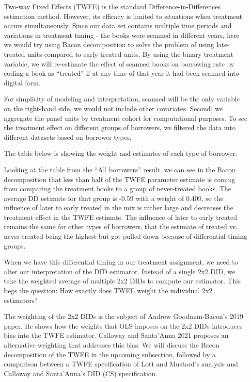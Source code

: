 \documentclass{article}
\begin{document}
Two-way Fixed Effects (TWFE) is the standard Difference-in-Differences estimation method. However, its efficacy is limited to situations when treatment occurs simultaneously. Since our data set contains multiple time periods and variations in treatment timing - the books were scanned in different years, here we would try using Bacon decomposition to solve the problem of using late-treated units compared to early-treated units. By using the binary treatment variable, we will re-estimate the effect of scanned books on borrowing rate by coding a book as “treated” if at any time of that year it had been scanned into digital form.

For simplicity of modeling and interpretation, scanned will be the only variable on the right-hand side, we would not include other covariates. Second, we aggregate the panel units by treatment cohort for computational purposes. To see the treatment effect on different groups of borrowers, we filtered the data into different datasets based on borrower types.

The table below is showing the weight and estimates of each type of borrower:



Looking at the table from the “All borrowers” result, we can see in the Bacon decomposition that less than half of the TWFE parameter estimate is coming from comparing the treatment books to a group of never-treated books. The average DD estimate for that group is -0.59  with a weight of 0.409, so the influence of later to early treated in the mix is rather large and decreases the treatment effect in the TWFE estimate. The influence of later to early treated remains the same for other types of borrowers, that the estimate of treated vs. never-treated being the highest but got pulled down because of differential timing groups.

When we have this differential timing in our treatment assignment, we need to alter our interpretation of the DID estimator. Instead of a single 2x2 DID, we take the weighted average of multiple 2x2 DIDs to compute our estimator. This begs the question: How exactly does TWFE weight the individual 2x2 estimators? 

The weighting of the 2x2 DIDs is the subject of Andrew Goodman-Bacon's 2019 paper. He shows how the weights that OLS imposes on the 2x2 DIDs introduces bias into the TWFE estimator. Calloway and Santa'Anna 2021 proposes an alternative weighting that addresses this bias. We will discuss the Bacon decomposition of the TWFE in the upcoming subsection, followed by a comparison between a TWFE specification of Lott and Mustard's analysis and Calloway and Santa'Anna's DID (CS) specification. 
\end{document}
